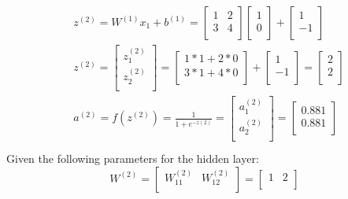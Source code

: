 \documentclass[leqno]{article}
\begin{document}
\begin{gather*}
\begin{split}
&z^{(2)} = W^{(1)}x_1 + b^{(1)} =
  \begin{bmatrix}
  1 & 2\\
  3 & 4\\ 
  \end{bmatrix}
  \begin{bmatrix}
  1\\
  0\\ 
  \end{bmatrix}
  +
 \begin{bmatrix}
  1\\
  -1\\ 
  \end{bmatrix}
\\
&z^{(2)} = 
\begin{bmatrix}
  z_1^{(2)}\\
  z_2^{(2)}\\ 
  \end{bmatrix}
  =
  \begin{bmatrix}
  1*1 + 2*0\\
  3*1 + 4*0\\ 
  \end{bmatrix}
  +
 \begin{bmatrix}
  1\\
  -1\\ 
  \end{bmatrix}
=
 \begin{bmatrix}
  2\\
  2\\ 
  \end{bmatrix}
\\
&a^{(2)} = f(z^{(2)}) = \frac{1}{1 + e^{-z{(2)}}} =
\begin{bmatrix}
   a_1^{(2)}\\
   a_2^{(2)}\\ 
  \end{bmatrix}
 =
 \begin{bmatrix}
   0.881\\
   0.881\\ 
  \end{bmatrix}
\\
\end{split}
\end{gather*}
Given the following parameters for the hidden layer:
\[
W^{(2)} =
  \begin{bmatrix}
  W_{11}^{(2)} & W_{12}^{(2)}\\
  \end{bmatrix}
  =
  \begin{bmatrix}
  1 & 2\\
  \end{bmatrix}
\]
\end{document}
